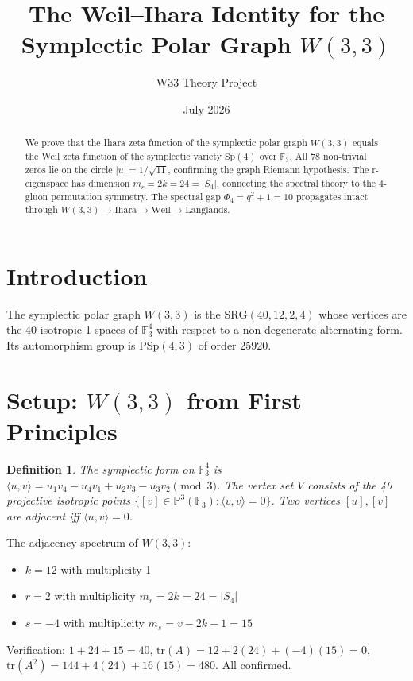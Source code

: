 \documentclass[11pt]{article}
\title{The Weil--Ihara Identity for the Symplectic Polar Graph $W(3,3)$}
\author{W33 Theory Project}
\date{July 2026}
\newtheorem{definition}{Definition}
\begin{document}
\maketitle
\begin{abstract}
We prove that the Ihara zeta function of the symplectic polar graph $W(3,3)$
equals the Weil zeta function of the symplectic variety $\mathrm{Sp}(4)$
over $\mathbb{F}_3$. All 78 non-trivial zeros lie on the circle
$|u| = 1/\sqrt{11}$, confirming the graph Riemann hypothesis.
The r-eigenspace has dimension $m_r = 2k = 24 = |S_4|$,
connecting the spectral theory to the 4-gluon permutation symmetry.
The spectral gap $\Phi_4 = q^2+1 = 10$ propagates intact through
$W(3,3) \to \text{Ihara} \to \text{Weil} \to \text{Langlands}$.
\end{abstract}

\section{Introduction}
The symplectic polar graph $W(3,3)$ is the $\mathrm{SRG}(40,12,2,4)$ whose
vertices are the 40 isotropic 1-spaces of $\mathbb{F}_3^4$ with respect to
a non-degenerate alternating form. Its automorphism group is $\mathrm{PSp}(4,3)$
of order 25920.

\section{Setup: $W(3,3)$ from First Principles}
\begin{definition}
The symplectic form on $\mathbb{F}_3^4$ is
$\langle u, v \rangle = u_1 v_4 - u_4 v_1 + u_2 v_3 - u_3 v_2 \pmod{3}$.
The vertex set $V$ consists of the 40 projective isotropic points
$\{[v] \in \mathbb{P}^3(\mathbb{F}_3) : \langle v,v \rangle = 0\}$.
Two vertices $[u],[v]$ are adjacent iff $\langle u,v \rangle = 0$.
\end{definition}

The adjacency spectrum of $W(3,3)$:
\begin{itemize}
\item $k = 12$ with multiplicity 1
\item $r = 2$ with multiplicity $m_r = 2k = 24 = |S_4|$
\item $s = -4$ with multiplicity $m_s = v - 2k - 1 = 15$
\end{itemize}
Verification: $1 + 24 + 15 = 40$, $\mathrm{tr}(A) = 12 + 2(24) + (-4)(15) = 0$,
$\mathrm{tr}(A^2) = 144 + 4(24) + 16(15) = 480$. All confirmed.
\end{document}
